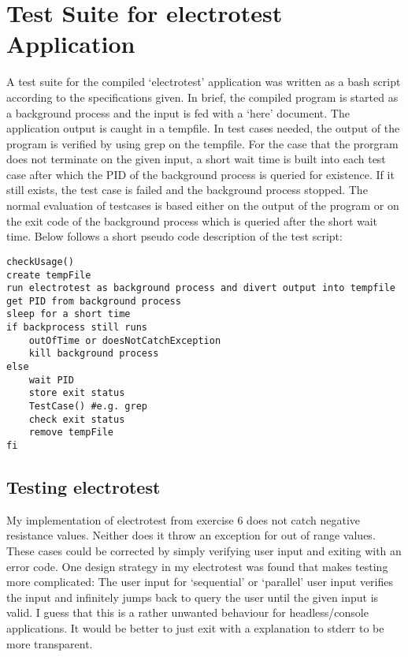 \documentclass[a4paper,11pt,twoside]{article}
\begin{document}
\section{Test Suite for electrotest Application}
A test suite for the compiled `electrotest' application was written as a bash script according to the specifications given. In brief, the compiled program is started as a background process and the input is fed with a `here' document. The application output is caught in a tempfile. In test cases needed, the output of the program is verified by using grep on the tempfile.
For the case that the prorgram does not terminate on the given input, a short wait time is built into each test case after which the PID of the background process is queried for existence. If it still exists, the test case is failed and the background process stopped. The normal evaluation of testcases is based either on the output of the program or on the exit code of the background process which is queried after the short wait time. Below follows a short pseudo code description of the test script: 

\begin{verbatim}
checkUsage()
create tempFile
run electrotest as background process and divert output into tempfile
get PID from background process
sleep for a short time
if backprocess still runs
    outOfTime or doesNotCatchException
    kill background process
else
    wait PID
    store exit status
    TestCase() #e.g. grep 
    check exit status
    remove tempFile
fi 
\end{verbatim}

\subsection{Testing electrotest}
My implementation of electrotest from exercise 6 does not catch negative resistance values. Neither does it throw an exception for out of range values. These cases could be corrected by simply verifying user input and exiting with an error code. One design strategy in my electrotest was found that makes testing more complicated: The user input for `sequential' or `parallel' user input verifies the input and infinitely jumps back to query the user until the given input is valid. I guess that this is a rather unwanted behaviour for headless/console applications. It would be better to just exit with a explanation to stderr to be more transparent.  
\end{document}
